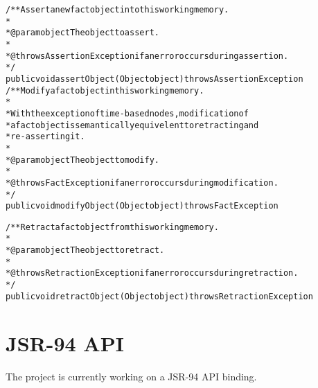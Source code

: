 \bigskip

\footnotesize
\begin{alltt}
/** Assert a new fact object into this working memory.
*
*  @param object The object to assert.
*
*  @throws AssertionException if an error occurs during assertion.
*/
public void assertObject(Object object) throws AssertionException
\newpage
/** Modify a fact object in this working memory.
*
*  With the exception of time-based nodes, modification of
*  a fact object is semantically equivelent to retracting and
*  re-asserting it.
*
*  @param object The object to modify.
*
*  @throws FactException if an error occurs during modification.
*/
public void modifyObject(Object object) throws FactException

/** Retract a fact object from this working memory.
*
*  @param object The object to retract.
*
*  @throws RetractionException if an error occurs during retraction.
*/
public void retractObject(Object object) throws RetractionException
\end{alltt}
\normalsize

\section{JSR-94 API}

The \drools{} project is currently working on a JSR-94 API binding.

